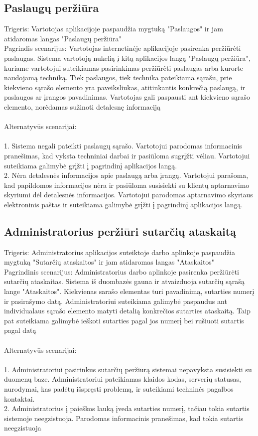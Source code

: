 \documentclass[oneside]{VUMIFPSkursinis}
\begin{document}
\subsection{Paslaugų peržiūra}
	Trigeris: Vartotojas aplikacijoje paspaudžia mygtuką "Paslaugos" ir jam atidaromas langas "Paslaugų peržiūra" \\
	Pagrindis scenarijus: Vartotojas internetinėje aplikacijoje pasirenka peržiūrėti paslaugas. Sistema vartotoją nukelią į kitą aplikacijos langą "Paslaugų peržiūra", kuriame vartotojui suteikiamas pasirinkimas peržiūrėti paslaugas arba kurorte naudojamą techniką. Tiek paslaugos, tiek technika pateikiama sąrašu, prie kiekvieno sąrašo elemento yra paveiksliukas, atitinkantis konkrečią paslaugą, ir paslaugos ar įrangos pavadinimas. Vartotojas gali paspausti ant kiekvieno sąrašo elemento, norėdamas sužinoti detalesnę informaciją \\ \\
Alternatyvūs scenarijai:\\ \\
1. Sistema negali pateikti paslaugų sąrašo. Vartotojui parodomas informacinis pranešimas, kad vyksta techniniai darbai ir pasiūloma sugrįžti vėliau. Vartotojui suteikiama galimybė grįžti į pagrindinį aplikacijos langą.\\
2. Nėra detalesnės informacijos apie paslaugą arba įrangą. Vartotojui parašoma, kad papildomos informacijos nėra ir pasiūloma susisiekti su klientų aptarnavimo skyriumi dėl detalesnės informacijos. Vartotojui parodomas aptarnavimo skyriaus elektroninis paštas ir suteikiama galimybė grįžti į pagrindinį aplikacijos langą.

\subsection{Administratorius peržiūri sutarčių ataskaitą}
	Trigeris: Administratorius aplikacijos suteiktoje darbo aplinkoje paspaudžia mygtuką "Sutarčių ataskaitos" ir jam atidaromas langas "Ataskaitos"\\
	Pagrindinis scenarijus: Administratorius darbo aplinkoje pasirenka peržiūrėti sutarčių ataskaitas. Sistema iš duombazės gauna ir atvaizduoja sutarčių sąrašą lange "Ataskaitos". Kiekvienas sarašo elementas turi pavadinimą, sutarties numerį ir pasirašymo datą. Administratoriui suteikiama galimybė paspaudus ant individualaus sąrašo elemento matyti detalią konkrečios sutarties ataskaitą. Taip pat suteikiama galimybė ieškoti sutarties pagal jos numerį bei rušiuoti sutartis pagal datą\\ \\
	Alternatyvūs scenarijai: \\ \\
1. Administratoriui pasirinkus sutarčių peržiūrą sistemai nepavyksta susisiekti su duomenų baze. Administratoriui pateikiamas klaidos kodas, serverių statusas, nurodymai, kas padėtų išspręsti problemą, ir suteikiami techninės pagalbos kontaktai. \\ 
2. Administratorius į paieškos lauką įveda sutarties numerį, tačiau tokia sutartis sistemoje neegzistuoja. Parodomas informacinis pranešimas, kad tokia sutartis neegzistuoja \\ \\
\end{document}
